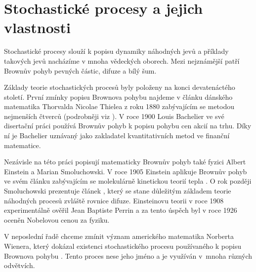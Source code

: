 \documentclass[a4paper,12pt]{report}
\theoremstyle{definition} \newtheorem{definice}[veta]{Definice}
\theoremstyle{remark}
\begin{document}
\section{Stochastické procesy a jejich vlastnosti}
Stochastické procesy slouží k popisu dynamiky náhodných jevů a příklady takových jevů nacházíme v mnoha vědeckých oborech.
Mezi nejznámější patří Brownův pohyb pevných částic, difuze a bílý šum.

Základy teorie stochastických procesů byly položeny na konci devatenáctého století.
První zmínky popisu Brownova pohybu najdeme v článku dánského matematika Thorvalda Nicolae Thielea z roku 1880 zabývajícím se metodou nejmenších čtverců (podrobněji viz \cite{lauritzen2002thiele}). %
V roce 1900 Louis Bachelier ve své disertační práci \cite{bachelier} používá Brownův pohyb k popisu pohybu cen akcií na trhu.
Díky ní je Bachelier uznávaný jako zakladatel kvantitativních metod ve finanční matematice.

Nezávisle na této práci popisují matematicky Brownův pohyb také fyzici Albert Einstein a Marian Smoluchowski. 
V roce 1905 Einstein aplikuje Brownův pohyb ve svém článku zabývajícím se molekulárně kinetickou teorií tepla \cite{einstein}.
O rok později Smoluchowski prezentuje článek \cite{Smoluchowski}, který se stane důležitým základem teorie náhodných procesů zvláště rovnice difuze.
Einsteinovu teorii v roce 1908 experimentálně ověřil Jean Baptiste Perrin \cite{perrin2013brownian} a za tento úspěch byl v roce 1926 oceněn Nobelovou cenou za fyziku. 

V neposlední řadě chceme zmínit význam amerického matematika Norberta Wienera, který dokázal existenci stochastického procesu používaného k popisu Brownova pohybu \cite{wiener1923differential}. 
Tento proces nese jeho jméno a je využíván v~mnoha různých odvětvích.
\end{document}
